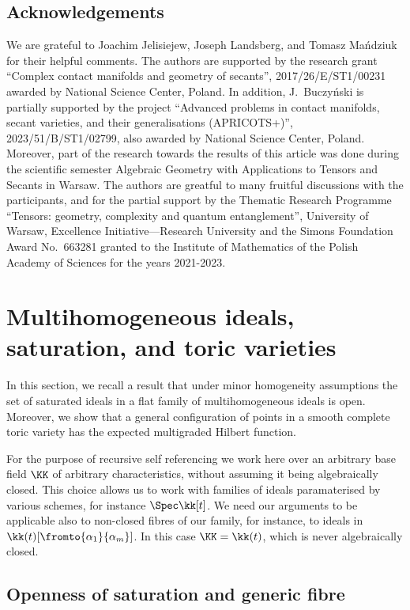 \documentclass[12pt,a4paper]{article}
\begin{document}
\subsection*{Acknowledgements}
We are grateful to Joachim Jelisiejew, Joseph Landsberg, and Tomasz Mańdziuk
  for their helpful comments.
The authors are supported by the research grant ``Complex contact manifolds and geometry of secants'', 2017/26/E/ST1/00231 awarded by National Science Center, Poland.
In addition, J.~Buczy{\'n}ski is partially supported by the project ``Advanced problems in contact manifolds, secant varieties, and their generalisations (\mbox{APRICOTS+})'',  2023/51/B/ST1/02799, also awarded by National Science Center, Poland.
Moreover, part of the research towards the results of this article was done during the scientific semester Algebraic Geometry with Applications to Tensors and Secants in Warsaw.
The authors are greatful to many fruitful discussions with the participants, and for the partial support by the Thematic Research Programme ``Tensors: geometry, complexity and quantum entanglement'', University of Warsaw, Excellence Initiative---Research University and the Simons Foundation Award No.~663281 granted to the Institute of Mathematics of the Polish Academy of Sciences for the years 2021-2023.

\section{Multihomogeneous ideals, saturation, and toric varieties}
In this section,
 we recall a result that under minor homogeneity assumptions the set of saturated ideals in a flat family of multihomogeneous ideals is open.
Moreover, we show that a general configuration of points in a smooth complete toric variety has the expected multigraded Hilbert function.

For the purpose of recursive self referencing we work here over an arbitrary base field
$\KK$ of arbitrary characteristics,  without assuming it being algebraically closed.
This choice  allows us to work  with families of ideals paramaterised by various schemes, for instance $\Spec \kk[t]$.
We need our arguments to be applicable also to non-closed fibres of our family, for instance, to ideals
in $\kk(t)[\fromto{\alpha_1}{\alpha_m}]$. In this case  $\KK=\kk(t)$, which is never algebraically closed.

\subsection{Openness of saturation and generic fibre}
\end{document}
